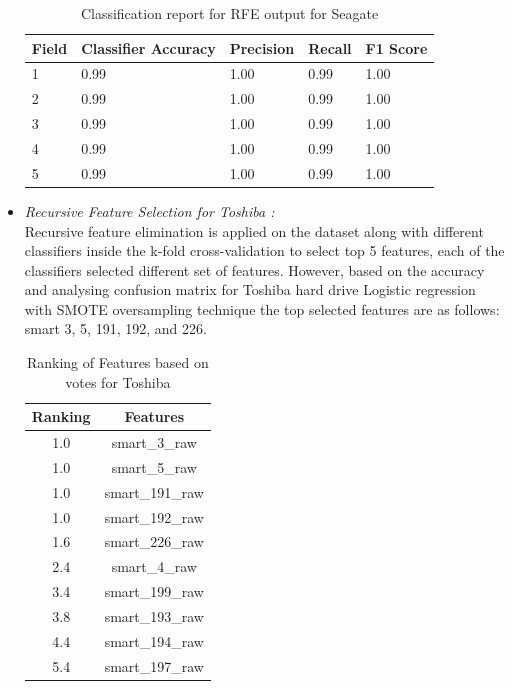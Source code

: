 \documentclass[conference]{IEEEtran}
\begin{document}
\begin{itemize}
    
       \begin{table}[]
   \begin{center}
    \caption{Classification report for RFE output for Seagate}   
    \begin{tabular}{||l|l|l|l|l||}
    \hline
    Field & Classifier Accuracy & Precision & Recall & F1 Score \\ \hline
    1     & 0.99                & 1.00         & 0.99   & 1.00     \\ \hline
    2     & 0.99                & 1.00         & 0.99   & 1.00     \\ \hline
    3     & 0.99                & 1.00         & 0.99   & 1.00     \\ \hline
    4     & 0.99                & 1.00         & 0.99   & 1.00     \\ \hline
    5     & 0.99                & 1.00         & 0.99   & 1.00     \\ \hline
    \end{tabular}
    \end{center}
    \end{table}
    
    
    
    
    \item \textit{Recursive Feature Selection for Toshiba :}\\
    Recursive feature elimination is applied on the dataset along with different classifiers inside the k-fold cross-validation to select top 5 features, each of the classifiers selected different set of features. However, based on the accuracy and analysing confusion matrix for Toshiba hard drive Logistic regression with SMOTE oversampling technique the top selected features are as follows: smart 3, 5, 191, 192, and 226.\\
    
    \begin{table}[]
    \begin{center}
    \caption{Ranking of Features based on votes for Toshiba}
    \begin{tabular}{|c||c|}
    \hline
    \textbf{Ranking} & \textbf{Features}\\ \hline
    1.0     & smart\_3\_raw   \\ \hline
    1.0     & smart\_5\_raw \\ \hline
    1.0     & smart\_191\_raw \\ \hline
    1.0     & smart\_192\_raw  \\ \hline
    1.6     & smart\_226\_raw   \\ \hline
    2.4     & smart\_4\_raw \\ \hline
    3.4     & smart\_199\_raw \\ \hline
    3.8     & smart\_193\_raw \\ \hline
    4.4     & smart\_194\_raw   \\ \hline
    5.4     & smart\_197\_raw \\ \hline
    \end{tabular}
    \end{center}
    \end{table}
    
\end{itemize}
\end{document}
